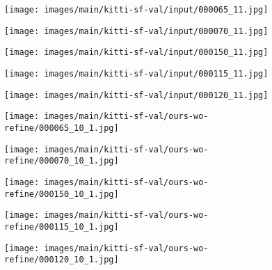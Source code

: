\documentclass[10pt,twocolumn,letterpaper]{article}
\begin{document}
\begin{figure*}
    \begin{subfigure}[b]{0.02\linewidth}
        \centering
    \end{subfigure}\hfill
    \begin{subfigure}[b]{0.19\linewidth}
        \texttt{[image: images/main/kitti-sf-val/input/000065\_11.jpg]}
    \end{subfigure}\hfill
    \begin{subfigure}[b]{0.19\linewidth}
        \texttt{[image: images/main/kitti-sf-val/input/000070\_11.jpg]}
    \end{subfigure}\hfill
    \begin{subfigure}[b]{0.19\linewidth}
        \texttt{[image: images/main/kitti-sf-val/input/000150\_11.jpg]}
    \end{subfigure}\hfill
    \begin{subfigure}[b]{0.19\linewidth}
        \texttt{[image: images/main/kitti-sf-val/input/000115\_11.jpg]}
    \end{subfigure}\hfill
    \begin{subfigure}[b]{0.19\linewidth}
        \texttt{[image: images/main/kitti-sf-val/input/000120\_11.jpg]}
    \end{subfigure}\hfill
    \begin{subfigure}[b]{0.02\linewidth}
        \hspace{10pt}
    \end{subfigure}\hfill

    \begin{subfigure}[b]{0.02\linewidth}
        \centering
    \end{subfigure}\hfill
    \begin{subfigure}[b]{0.19\linewidth}
        \texttt{[image: images/main/kitti-sf-val/ours-wo-refine/000065\_10\_1.jpg]}
    \end{subfigure}\hfill
    \begin{subfigure}[b]{0.19\linewidth}
        \texttt{[image: images/main/kitti-sf-val/ours-wo-refine/000070\_10\_1.jpg]}
    \end{subfigure}\hfill
    \begin{subfigure}[b]{0.19\linewidth}
        \texttt{[image: images/main/kitti-sf-val/ours-wo-refine/000150\_10\_1.jpg]}
    \end{subfigure}\hfill
    \begin{subfigure}[b]{0.19\linewidth}
        \texttt{[image: images/main/kitti-sf-val/ours-wo-refine/000115\_10\_1.jpg]}
    \end{subfigure}\hfill
    \begin{subfigure}[b]{0.19\linewidth}
        \texttt{[image: images/main/kitti-sf-val/ours-wo-refine/000120\_10\_1.jpg]}
    \end{subfigure}\hfill
    \begin{subfigure}[b]{0.02\linewidth}
        \hspace{10pt}
    \end{subfigure}\hfill


\end{figure*}
\end{document}
